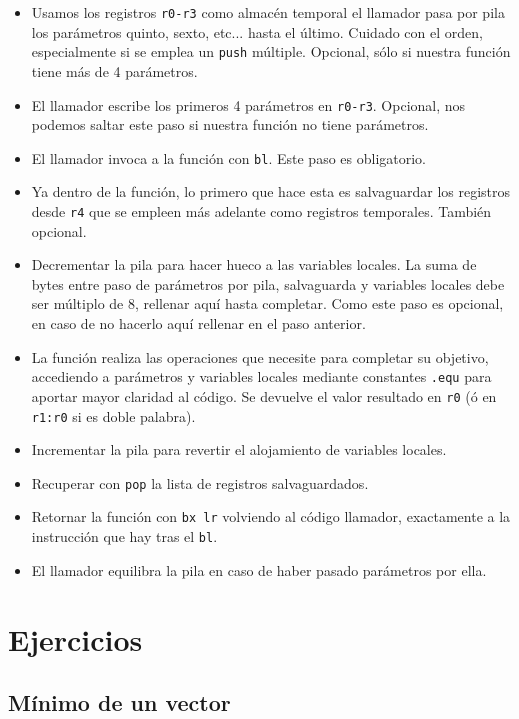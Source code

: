 \begin{itemize}
  \item Usamos los registros {\tt r0-r3} como almacén temporal el llamador pasa por pila
        los parámetros quinto, sexto, etc... hasta el último. Cuidado con el orden,
        especialmente si se emplea un {\tt push} múltiple. Opcional, sólo si nuestra
        función tiene más de 4 parámetros.
  \item El llamador escribe los primeros 4 parámetros en {\tt r0-r3}. Opcional, nos
        podemos saltar este paso si nuestra función no tiene parámetros.
  \item El llamador invoca a la función con {\tt bl}. Este paso es obligatorio.
  \item Ya dentro de la función, lo primero que hace esta es salvaguardar los registros
        desde {\tt r4} que se empleen más adelante como registros temporales. También opcional.
  \item Decrementar la pila para hacer hueco a las variables locales. La suma de bytes
        entre paso de parámetros por pila, salvaguarda y variables locales debe ser
        múltiplo de 8, rellenar aquí hasta completar. Como este paso es opcional, en caso
        de no hacerlo aquí rellenar en el paso anterior.
  \item La función realiza las operaciones que necesite para completar su objetivo, accediendo
        a parámetros y variables locales mediante constantes {\tt .equ} para aportar mayor claridad
        al código. Se devuelve el valor resultado en {\tt r0} (ó en {\tt r1:r0} si es doble
        palabra).
  \item Incrementar la pila para revertir el alojamiento de variables locales.
  \item Recuperar con {\tt pop} la lista de registros salvaguardados.
  \item Retornar la función con {\tt bx lr} volviendo al código llamador, exactamente a la
        instrucción que hay tras el {\tt bl}. 
  \item El llamador equilibra la pila en caso de haber pasado parámetros por ella.
\end{itemize}

\section{Ejercicios}

\subsection{Mínimo de un vector}

